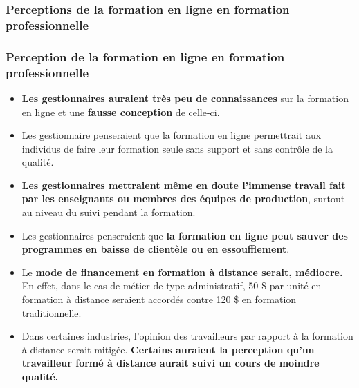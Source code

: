 					\subsubsection{Perceptions de la formation en ligne en formation professionnelle} 
						\begin{frame}[allowframebreaks]
						\frametitle{Perception de la formation en ligne en formation professionnelle}
                        			
                        			\begin{itemize}
                        			\item \textbf{Les gestionnaires auraient très peu de connaissances} sur la formation en ligne et une \textbf{fausse conception} de celle-ci. 
                        			\item Les gestionnaire penseraient que la formation en ligne permettrait aux individus de faire leur formation seule sans support et sans contrôle de la qualité. 
                        			\item \textbf{Les gestionnaires mettraient même en doute l’immense travail fait par les enseignants ou membres des équipes de production}, surtout au niveau du suivi pendant la formation.
                        			\item Les gestionnaires penseraient que\textbf{ la formation en ligne peut sauver des programmes en baisse de clientèle ou en essoufflement}. 
                        			\item Le \textbf{mode de financement en formation à distance serait, médiocre.} En effet, dans le cas de métier de type administratif, 50 \$ par unité en formation à distance seraient accordés contre 120 \$ en formation traditionnelle. 
                        			\item Dans certaines industries, l’opinion des travailleurs par rapport à la formation à distance serait mitigée. \textbf{Certains auraient la perception qu’un travailleur formé à distance aurait suivi un cours de moindre qualité.}
                        			
						\end{itemize}
						\end{frame}	
						
